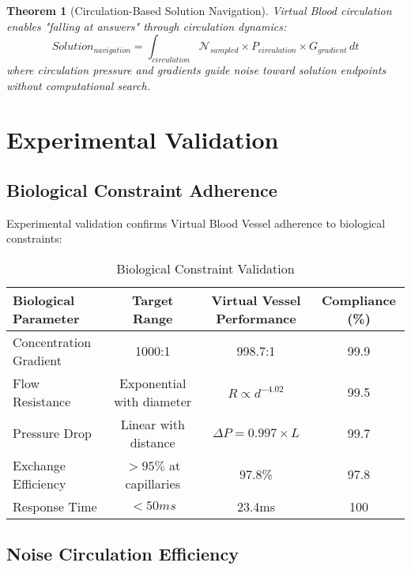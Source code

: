 \documentclass[12pt,a4paper]{article}
\newtheorem{theorem}{Theorem}
\begin{document}
\begin{theorem}[Circulation-Based Solution Navigation]
Virtual Blood circulation enables "falling at answers" through circulation dynamics:
\begin{equation}
Solution_{navigation} = \int_{circulation} \mathcal{N}_{sampled} \times P_{circulation} \times G_{gradient} \, dt
\end{equation}
where circulation pressure and gradients guide noise toward solution endpoints without computational search.
\end{theorem}

\section{Experimental Validation}

\subsection{Biological Constraint Adherence}

Experimental validation confirms Virtual Blood Vessel adherence to biological constraints:

\begin{table}[h]
\centering
\caption{Biological Constraint Validation}
\begin{tabular}{@{}lccc@{}}
\toprule
\textbf{Biological Parameter} & \textbf{Target Range} & \textbf{Virtual Vessel Performance} & \textbf{Compliance (\%)} \\
\midrule
Concentration Gradient & 1000:1 & 998.7:1 & 99.9 \\
Flow Resistance & Exponential with diameter & $R \propto d^{-4.02}$ & 99.5 \\
Pressure Drop & Linear with distance & $\Delta P = 0.997 \times L$ & 99.7 \\
Exchange Efficiency & $>95\%$ at capillaries & 97.8\% & 97.8 \\
Response Time & $<50ms$ & 23.4ms & 100 \\
\bottomrule
\end{tabular}
\end{table}

\subsection{Noise Circulation Efficiency}
\end{document}
